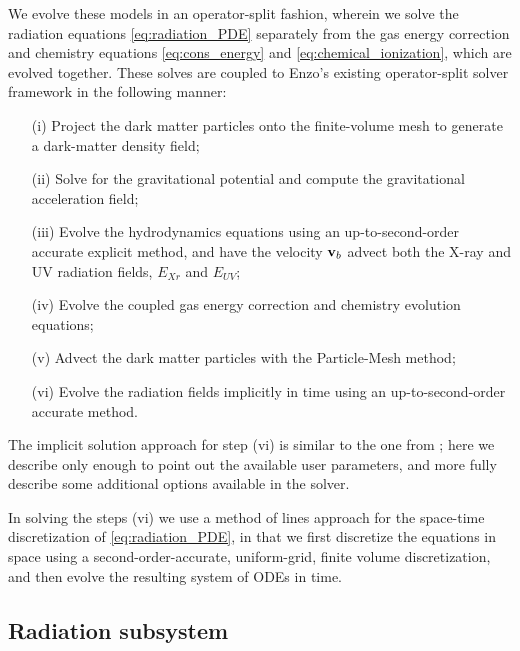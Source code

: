 \documentclass[letterpaper,10pt]{article}
\renewcommand{\(}{\left(}
\renewcommand{\)}{\right)}
\newcommand{\vb}{{\bf v}_b}
\begin{document}
We evolve these models in an operator-split fashion, wherein we solve
the radiation equations \eqref{eq:radiation_PDE} separately from the 
gas energy correction and chemistry equations
\eqref{eq:cons_energy} and \eqref{eq:chemical_ionization}, 
which are evolved together.  These solves are coupled to Enzo's
existing operator-split solver framework in the following manner:
\begin{itemize}
\item[(i)] Project the dark matter particles onto the finite-volume
  mesh to generate a dark-matter density field;
\item[(ii)] Solve for the gravitational potential and compute the
  gravitational acceleration field;
\item[(iii)] Evolve the hydrodynamics equations using an
  up-to-second-order accurate explicit method, and have the velocity
  $\vb$ advect both the X-ray and UV radiation fields, $E_{Xr}$ and
  $E_{UV}$; 
\item[(iv)] Evolve the coupled gas energy correction and chemistry
  evolution equations;  
\item[(v)] Advect the dark matter particles with the Particle-Mesh
  method;
\item[(vi)] Evolve the radiation fields implicitly in time using an
  up-to-second-order accurate method.
\end{itemize}

The implicit solution approach for step (vi) is similar to the one
from \cite{NormanReynoldsSoHarkness2013}; here we describe only enough
to point out the available user parameters, and more fully describe
some additional options available in the solver.  

In solving the steps (vi) we use a method of lines approach for the
space-time discretization of \eqref{eq:radiation_PDE}, in that we
first discretize the equations in space using a second-order-accurate,
uniform-grid, finite volume discretization, and then evolve the
resulting system of ODEs in time.


\subsection{Radiation subsystem}
\label{sec:rad_solve}
\end{document}
